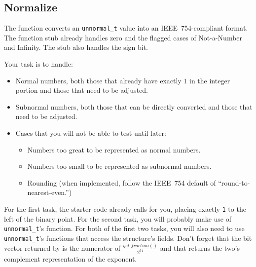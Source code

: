 \subsection*{Normalize}

The  function converts an \lstinline{unnormal_t} value into an IEEE~754-compliant format.
The function stub already handles zero and the flagged cases of Not-a-Number and Infinity.
The stub also handles the sign bit.

Your task is to handle:
\begin{itemize}
    \item Normal numbers, both those that already have exactly $1$ in the integer portion and those that need to be adjusted.
    \item Subnormal numbers, both those that can be directly converted and those that need to be adjusted.
    \item Cases that you will not be able to test until later:
    \begin{itemize}
        \item Numbers too great to be represented as normal numbers.
        \item Numbers too small to be represented as subnormal numbers.
        \item Rounding (when implemented, follow the IEEE~754 default of ``round-to-nearest-even.'')
    \end{itemize}
\end{itemize}

For the first task, the starter code already calls  for you, placing exactly \lstinline{1} to the left of the binary point.
For the second task, you will probably make use of \lstinline{unnormal_t}'s  function.
For both of the first two tasks, you will also need to use \lstinline{unnormal_t}'s functions that access the structure's fields.
Don't forget that the bit vector returned by  is the numerator of $\frac{get\_fraction()}{2^{64}}$ and that  returns the two's complement representation of the exponent.

